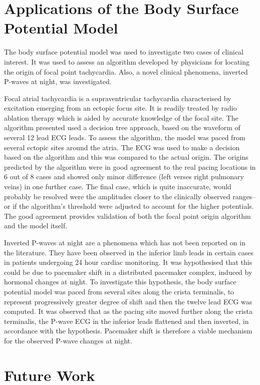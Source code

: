 \section{Applications of the Body Surface Potential Model}

The body surface potential model was used to investigate two cases of clinical
interest.
It was used to assess an algorithm developed by physicians for locating the
origin of focal point tachycardia.
Also, a novel clinical phenomena, inverted P-waves at night, was investigated.

Focal atrial tachycardia is a supraventricular tachycardia characterised by
excitation emerging from an ectopic focus site.
It is readily treated by radio ablation therapy which is aided by accurate
knowledge of the focal site.
The algorithm presented used a decision tree approach, based on the waveform of
several 12 lead ECG leads.
To assess the algorithm, the model was paced from several ectopic sites around
the atria.
The ECG was used to make a decision based on the algorithm and this was compared
to the actual origin.
The origins predicted by the algorithm were in good agreement to the real pacing
locations in 6 out of 8 cases and showed only minor difference (left verses
right pulmonary veins) in one further case.
The final case, which is quite inaccurate, would probably be resolved were the
amplitudes closer to the clinically observed ranges--or if the algorithm's
threshold were adjusted to account for the higher potentials.
The good agreement provides validation of both the focal point origin algorithm
and the model itself.

Inverted P-waves at night are a phenomena which has not been reported on in the
literature.
They have been observed in the inferior limb leads in certain cases in patients
undergoing 24 hour cardiac monitoring.
It was hypothesised that this could be due to pacemaker shift in a distributed
pacemaker complex, induced by hormonal changes at night.
To investigate this hypothesis, the body surface potential model was paced from
several sites along the crista terminalis, to represent progressively greater
degree of shift and then the twelve lead ECG was computed.
It was observed that as the pacing site moved further along the crista
terminalis, the P-wave ECG in the inferior leads flattened and then inverted, in
accordance with the hypothesis.
Pacemaker shift is therefore a viable mechanism for the observed P-wave changes
at night.

\section{Future Work}

